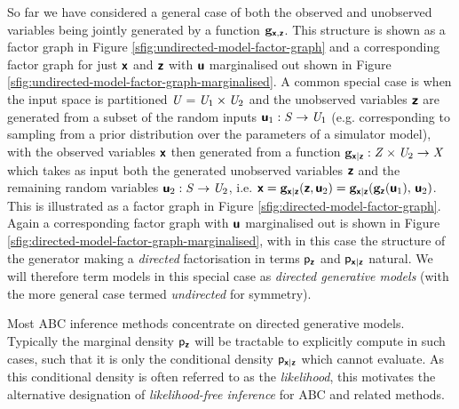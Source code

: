 So far we have considered a general case of both the observed and unobserved variables being jointly generated by a function ${\mathbf{g}}_{\boldsymbol{\mathsf{x}},\boldsymbol{\mathsf{z}}}$. This structure is shown as a factor graph in Figure \ref{sfig:undirected-model-factor-graph} and a corresponding factor graph for just $\boldsymbol{\mathsf{x}}$ and $\boldsymbol{\mathsf{z}}$ with $\boldsymbol{\mathsf{u}}$ marginalised out shown in Figure \ref{sfig:undirected-model-factor-graph-marginalised}. A common special case is when the input space is partitioned $\mathit{U} = \mathit{U}_1 \times \mathit{U}_2$ and the unobserved variables $\boldsymbol{\mathsf{z}}$ are generated from a subset of the random inputs $\boldsymbol{\mathsf{u}}_1 : \mathit{S} \to \mathit{U}_1$ (e.g. corresponding to sampling from a prior distribution over the parameters of a simulator model), with the observed variables $\boldsymbol{\mathsf{x}}$ then generated from a function ${\mathbf{g}}_{\boldsymbol{\mathsf{x}}|\boldsymbol{\mathsf{z}}} : \mathit{Z} \times \mathit{U}_2 \to \mathit{X}$ which takes as input both the generated unobserved variables $\boldsymbol{\mathsf{z}}$ and the remaining random variables $\boldsymbol{\mathsf{u}}_2 : \mathit{S} \to \mathit{U}_2$, i.e. $\rvct{x} = \genfunc_{\rvct{x}|\rvct{z}}(\rvct{z},\rvct{u}_2) = \genfunc_{\rvct{x}|\rvct{z}}\lpa\genfunc_{\rvct{z}}(\rvct{u}_1),\,\rvct{u}_2\rpa$. This is illustrated as a factor graph in Figure \ref{sfig:directed-model-factor-graph}. Again a corresponding factor graph with $\boldsymbol{\mathsf{u}}$ marginalised out is shown in Figure \ref{sfig:directed-model-factor-graph-marginalised}, with in this case the structure of the generator making a \emph{directed} factorisation in terms $\mathsf{p}_{\boldsymbol{\mathsf{z}}}$ and $\mathsf{p}_{\boldsymbol{\mathsf{x}}|\boldsymbol{\mathsf{z}}}$ natural. We will therefore term models in this special case as \emph{directed generative models} (with the more general case termed \emph{undirected} for symmetry).

Most \ac{ABC} inference methods concentrate on directed generative models. Typically the marginal density $\mathsf{p}_{\boldsymbol{\mathsf{z}}}$ will be tractable to explicitly compute in such cases, such that it is only the conditional density $\mathsf{p}_{\boldsymbol{\mathsf{x}}|\boldsymbol{\mathsf{z}}}$ which cannot evaluate. As this conditional density is often referred to as the \emph{likelihood}, this motivates the alternative designation of \emph{likelihood-free inference} for \ac{ABC} and related methods.



